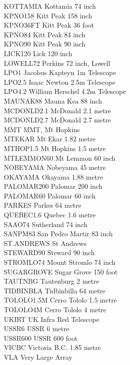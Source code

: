 {\begin{tabbing}
KOTTAMIA   \> Kottamia 74 inch \\
KPNO158    \> Kitt Peak 158 inch \\
KPNO36FT   \> Kitt Peak 36 foot \\
KPNO84     \> Kitt Peak 84 inch \\
KPNO90     \> Kitt Peak 90 inch \\
LICK120    \> Lick 120 inch \\
LOWELL72   \> Perkins 72 inch, Lowell \\
LPO1       \> Jacobus Kapteyn 1m Telescope \\
LPO2.5     \> Isaac Newton 2.5m Telescope \\
LPO4.2     \> William Herschel 4.2m Telescope \\
MAUNAK88   \> Mauna Kea 88 inch \\
MCDONLD2.1 \> McDonald 2.1 metre \\
MCDONLD2.7 \> McDonald 2.7 metre \\
MMT        \> MMT, Mt Hopkins \\
MTEKAR     \> Mt Ekar 1.82 metre \\
MTHOP1.5   \> Mt Hopkins 1.5 metre \\
MTLEMMON60 \> Mt Lemmon 60 inch \\
NOBEYAMA   \> Nobeyama 45 metre \\
OKAYAMA    \> Okayama 1.88 metre \\
PALOMAR200 \> Palomar 200 inch \\
PALOMAR60  \> Palomar 60 inch \\
PARKES     \> Parkes 64 metre \\
QUEBEC1.6  \> Quebec 1.6 metre \\
SAAO74     \> Sutherland 74 inch \\
SANPM83    \> San Pedro Martir 83 inch \\
ST.ANDREWS \> St Andrews \\
STEWARD90  \> Steward 90 inch \\
STROMLO74  \> Mount Stromlo 74 inch \\
SUGARGROVE \> Sugar Grove 150 foot \\
TAUTNBG    \> Tautenburg 2 metre \\
TIDBINBLA  \> Tidbinbilla 64 metre \\
TOLOLO1.5M \> Cerro Tololo 1.5 metre \\
TOLOLO4M   \> Cerro Tololo 4 metre \\
UKIRT      \> UK Infra Red Telescope \\
USSR6      \> USSR 6 metre \\
USSR600    \> USSR 600 foot \\
VICBC      \> Victoria B.C. 1.85 metre \\
VLA        \> Very Large Array
\end{tabbing}
}
